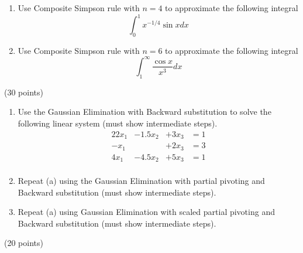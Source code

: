 \documentclass[10pt]{jhwhw}
\begin{document}
	\begin{enumerate}
		\item Use Composite Simpson rule with $n=4$ to approximate the following integral
			$$
				\int_0^1 x^{-1/4} \sin xdx
			$$
		\item Use Composite Simpson rule with $n=6$ to approximate the following integral
			$$
				\int_1^{\infty} \frac{\cos x}{x^3} dx
			$$
	\end{enumerate}

\solution

\problem{} (30 points)

	\begin{enumerate}
		\item Use the Gaussian Elimination with Backward substitution to solve the following
			linear system (must show intermediate steps).
			\begin{alignat*}{2}
				2x_1 &- 1.5x_2 &+ 3x_3 &= 1 \\
				-x_1 &         &+ 2x_3 &= 3 \\
				4x_1 &- 4.5x_2 &+ 5x_3 &= 1 \\
			\end{alignat*}
		\item Repeat (a) using the Gaussian Elimination with partial pivoting and Backward
			substitution (must show intermediate steps).
		\item Repeat (a) using Gaussian Elimination with scaled partial pivoting and 
			Backward substitution (must show intermediate steps).
	\end{enumerate}

\solution

\problem{} (20 points)
\end{document}
